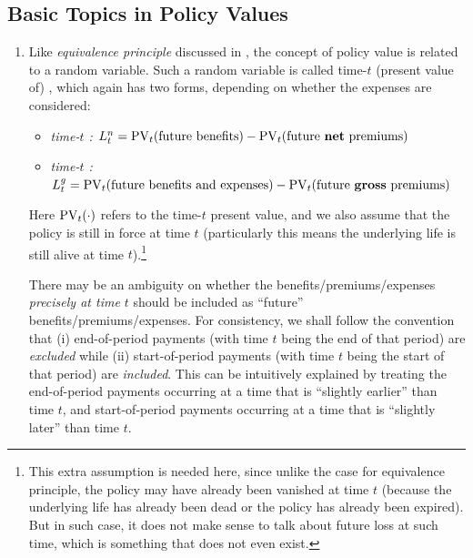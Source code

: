 \subsection{Basic Topics in Policy Values}
\label{subsect:policy-val-basic}
\begin{enumerate}
\item Like \emph{equivalence principle} discussed in ,  the
concept of policy value is related to a random variable. Such a random variable
is called time-\(t\) (present value of) ,
which again has two forms, depending on whether the expenses are considered:
\begin{itemize}
\item \emph{time-\(t\) :} \(L_t^n=\operatorname{PV}_{t}(\text{future benefits})
-\operatorname{PV}_{t}(\text{future \textbf{net} premiums})\)
\item \emph{time-\(t\) :} \(L_t^g=\operatorname{PV}_{t}(\text{future
benefits and expenses}) -\operatorname{PV}_{t}(\text{future \textbf{gross} premiums})\)
\end{itemize}
Here \(\operatorname{PV}_{t}(\cdot)\) refers to the time-\(t\) present value, and we also
assume that the policy is still in force at time \(t\) (particularly this means
the underlying life is still alive at time \(t\)).\footnote{This extra
assumption is needed here, since unlike the case for equivalence principle, the
policy may have already been vanished at time \(t\) (because the underlying life
has already been dead  or the policy has already been expired).
But in such case, it does not make sense to talk about future loss at such
time, which is something that does not even exist.}

\begin{warning}
There may be an ambiguity on whether the benefits/premiums/expenses
\emph{precisely at time \(t\)} should be included as ``future''
benefits/premiums/expenses. For consistency, we shall follow the convention
that (i) end-of-period payments (with time \(t\) being the end of that period)
are \emph{excluded} while (ii) start-of-period payments (with time \(t\) being
the start of that period) are \emph{included}. This can be intuitively
explained by treating the end-of-period payments occurring at a time that is
``slightly earlier'' than time \(t\), and start-of-period payments occurring at
a time that is ``slightly later'' than time \(t\).


\end{warning}
\end{enumerate}
